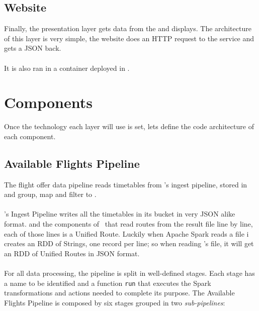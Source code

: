 
\subsection{Website}

Finally, the presentation layer gets data from the  and displays. The architecture of this layer is very simple, the website does an HTTP request to the service and gets a JSON back.
\\\\
It is also ran in a  container deployed in .


\section{Components}

Once the technology each layer will use is set, lets define the code architecture of each component.


\subsection{Available Flights Pipeline} \label{available-flights-pipeline}

The flight offer data pipeline reads timetables from \squad's ingest pipeline, stored in  and group, map and filter to .
\\\\
\squad's Ingest Pipeline writes all the timetables in its  bucket in very JSON\cite{json} alike format.  and the components of \squad\ that read routes from the result file line by line, each of those lines is a Unified Route. Luckily when Apache Spark reads a file i creates an RDD of Strings, one record per line; so when reading \squad's file, it will get an RDD of Unified Routes in JSON\cite{json} format.
\\\\
For all data processing, the pipeline is split in well-defined stages. Each stage has a name to be identified and a function \texttt{run} that executes the Spark transformations and actions needed to complete its purpose. The Available Flights Pipeline is composed by six stages grouped in two \textit{sub-pipelines}:

